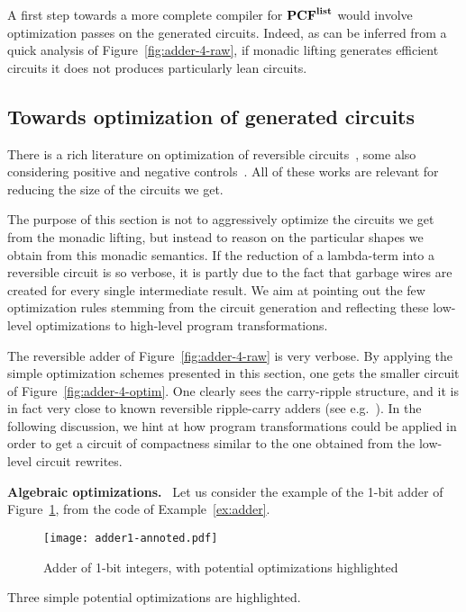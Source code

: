 \documentclass{article}
\theoremstyle{plain}
\theoremstyle{definition}
\newcommand{\PCF}{\mbox{${\bf PCF}^{\bf list}$}}
\begin{document}
A first step towards a more complete compiler for \PCF{} would involve
optimization passes on the generated circuits.  Indeed, as can be
inferred from a quick analysis of Figure~\ref{fig:adder-4-raw}, if
monadic lifting generates efficient circuits it does not produces
particularly lean circuits.


\subsection{Towards optimization of generated circuits}
\label{sec:optim}

There is a rich literature on optimization of reversible
circuits~\cite{rev-survey-2011,revkit,maslov-templates-iccad03}, some
also considering positive and negative
controls~\cite{soeken13white}. All of these works are relevant for
reducing the size of the circuits we get.

The purpose of this section is not to aggressively optimize the
circuits we get from the monadic lifting, 
but instead to reason on the particular shapes we obtain from
this monadic semantics. If the reduction of a lambda-term into a
reversible circuit is so verbose, it is partly due to the fact that
garbage wires are created for every single intermediate result. We aim
at pointing out the few optimization rules stemming from the circuit
generation and reflecting these low-level optimizations to
high-level program transformations.

The reversible adder of Figure~\ref{fig:adder-4-raw} is very
verbose. By applying the simple optimization schemes presented
in this section, one gets the smaller circuit of
Figure~\ref{fig:adder-4-optim}. One clearly sees the carry-ripple
structure, and it is in fact very close to known reversible
ripple-carry adders (see e.g.~\cite{feynman85quantum}). In the following
discussion, we hint at how program transformations could be applied in
order to get a circuit of compactness similar to the one obtained from
the low-level circuit rewrites.


\smallskip
\noindent
{{\bf Algebraic optimizations.}}~
Let us consider the example of the 1-bit adder of
Figure~\ref{fig:optim}, from the code of Example~\ref{ex:adder}.
\begin{figure}[tb]
  \centering
  \texttt{[image: adder1-annoted.pdf]}
  \caption{Adder of 1-bit integers, with potential optimizations highlighted}
\label{fig:optim}
\end{figure}
Three simple potential optimizations are highlighted.
\end{document}
